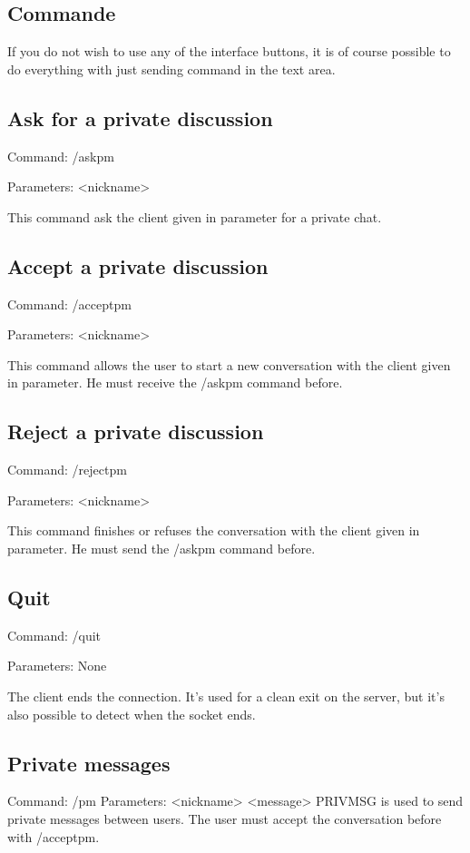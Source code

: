 \documentclass[12pt]{article}
\begin{document}
\begin{flushleft}
    \section{Commande}
If you do not wish to use any of the interface buttons, it is of course possible to do everything with just sending command in the text area.

    \subsection{Ask for a private discussion}
Command: /askpm

Parameters: <nickname>

This command ask the client given in parameter for a private chat.


    \subsection{Accept a private discussion}
Command: /acceptpm

Parameters: <nickname>

This command allows the user to start a new conversation with the client given in parameter.
He must receive the /askpm command before.


    \subsection{Reject a private discussion}
Command: /rejectpm
	
Parameters: <nickname>
	
This command finishes or refuses the conversation with the client given in parameter.
He must send the /askpm command before.

    \subsection{Quit}
Command: /quit

Parameters: None

The client ends the connection. It’s used for a clean exit on the server, but it’s also possible to detect when the socket ends.


    \subsection{Private messages}
Command: /pm
Parameters: <nickname> <message>
PRIVMSG is used to send private messages between users. The user must accept the conversation before with /acceptpm.


\end{flushleft}
\end{document}
